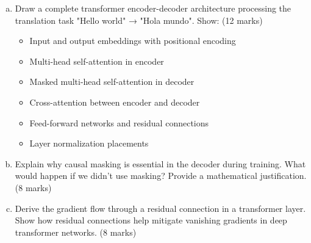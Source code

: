 \documentclass[12pt]{article}
\newcommand{\shortanswer}{\vspace{2cm}}          %
\newcommand{\mediumanswer}{\vspace{3cm}}         %
\begin{document}
\begin{enumerate}[(a)]
    \item Draw a complete transformer encoder-decoder architecture processing the translation task "Hello world" → "Hola mundo". Show: \hfill (12 marks)
    \begin{itemize}
        \item Input and output embeddings with positional encoding
        \item Multi-head self-attention in encoder
        \item Masked multi-head self-attention in decoder
        \item Cross-attention between encoder and decoder
        \item Feed-forward networks and residual connections
        \item Layer normalization placements
    \end{itemize}
    
    \begin{center}
    \end{center}
    
    \shortanswer
    
    \item Explain why causal masking is essential in the decoder during training. What would happen if we didn't use masking? Provide a mathematical justification. \hfill (8 marks)
    
    \mediumanswer
    
    \item Derive the gradient flow through a residual connection in a transformer layer. Show how residual connections help mitigate vanishing gradients in deep transformer networks. \hfill (8 marks)
    
    \mediumanswer
\end{enumerate}
\end{document}
